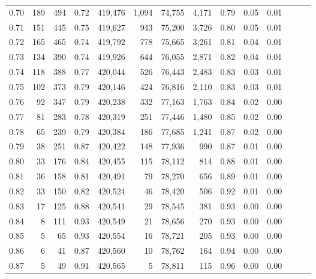 \begin{tabular}{rrrrrrrrrrrrrr}
0.70 &     189 &    494 &  0.72 &  419,476 &    1,094 &  74,755 &   4,171 &  0.79 &  0.05 &      0.01 \\
0.71 &     151 &    445 &  0.75 &  419,627 &      943 &  75,200 &   3,726 &  0.80 &  0.05 &      0.01 \\
0.72 &     165 &    465 &  0.74 &  419,792 &      778 &  75,665 &   3,261 &  0.81 &  0.04 &      0.01 \\
0.73 &     134 &    390 &  0.74 &  419,926 &      644 &  76,055 &   2,871 &  0.82 &  0.04 &      0.01 \\
0.74 &     118 &    388 &  0.77 &  420,044 &      526 &  76,443 &   2,483 &  0.83 &  0.03 &      0.01 \\
0.75 &     102 &    373 &  0.79 &  420,146 &      424 &  76,816 &   2,110 &  0.83 &  0.03 &      0.01 \\
0.76 &      92 &    347 &  0.79 &  420,238 &      332 &  77,163 &   1,763 &  0.84 &  0.02 &      0.00 \\
0.77 &      81 &    283 &  0.78 &  420,319 &      251 &  77,446 &   1,480 &  0.85 &  0.02 &      0.00 \\
0.78 &      65 &    239 &  0.79 &  420,384 &      186 &  77,685 &   1,241 &  0.87 &  0.02 &      0.00 \\
0.79 &      38 &    251 &  0.87 &  420,422 &      148 &  77,936 &     990 &  0.87 &  0.01 &      0.00 \\
0.80 &      33 &    176 &  0.84 &  420,455 &      115 &  78,112 &     814 &  0.88 &  0.01 &      0.00 \\
0.81 &      36 &    158 &  0.81 &  420,491 &       79 &  78,270 &     656 &  0.89 &  0.01 &      0.00 \\
0.82 &      33 &    150 &  0.82 &  420,524 &       46 &  78,420 &     506 &  0.92 &  0.01 &      0.00 \\
0.83 &      17 &    125 &  0.88 &  420,541 &       29 &  78,545 &     381 &  0.93 &  0.00 &      0.00 \\
0.84 &       8 &    111 &  0.93 &  420,549 &       21 &  78,656 &     270 &  0.93 &  0.00 &      0.00 \\
0.85 &       5 &     65 &  0.93 &  420,554 &       16 &  78,721 &     205 &  0.93 &  0.00 &      0.00 \\
0.86 &       6 &     41 &  0.87 &  420,560 &       10 &  78,762 &     164 &  0.94 &  0.00 &      0.00 \\
0.87 &       5 &     49 &  0.91 &  420,565 &        5 &  78,811 &     115 &  0.96 &  0.00 &      0.00 \\

\end{tabular}
